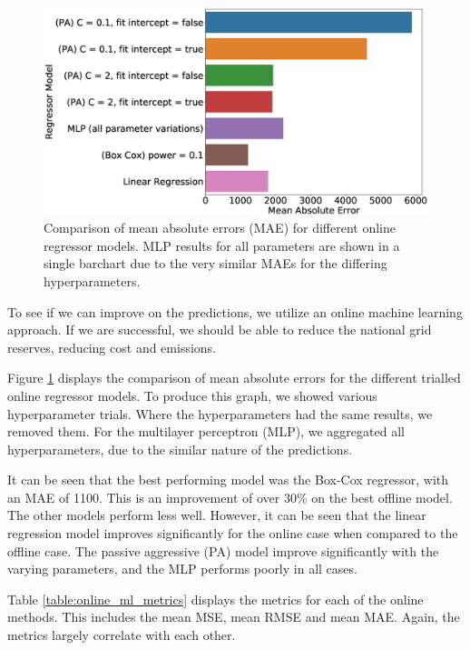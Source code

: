 \documentclass[final,3p,times,twocolumn,numbers]{elsarticle}
\begin{document}
\begin{figure}[h]
\centering
\includegraphics[width=\columnwidth,natwidth=1300,natheight=750]{figures/results/online_model_mae_barplot.eps}
\caption{Comparison of mean absolute errors (MAE) for different online regressor models. MLP results for all parameters are shown in a single barchart due to the very similar MAEs for the differing hyperparameters.}
\label{fig:online_model_mae_barplot}
\end{figure}



To see if we can improve on the predictions, we utilize an online machine learning approach. If we are successful, we should be able to reduce the national grid reserves, reducing cost and emissions.


Figure \ref{fig:online_model_mae_barplot} displays the comparison of mean absolute errors for the different trialled online regressor models. To produce this graph, we showed various hyperparameter trials. Where the hyperparameters had the same results, we removed them. For the multilayer perceptron (MLP), we aggregated all hyperparameters, due to the similar nature of the predictions.

It can be seen that the best performing model was the Box-Cox regressor, with an MAE of 1100. This is an improvement of over 30\% on the best offline model. The other models perform less well. However, it can be seen that the linear regression model improves significantly for the online case when compared to the offline case. The passive aggressive (PA) model improve significantly with the varying parameters, and the MLP performs poorly in all cases.


Table \ref{table:online_ml_metrics} displays the metrics for each of the online methods. This includes the mean MSE, mean RMSE and mean MAE. Again, the metrics largely correlate with each other.
\end{document}
